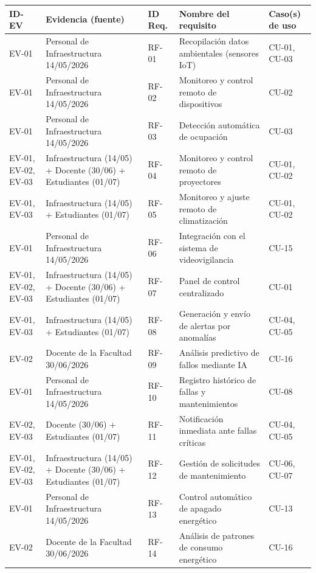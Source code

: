 \begingroup
\small
\begin{longtable}{|p{3.1cm}|p{3.1cm}|p{3.1cm}|p{3.1cm}|p{3.1cm}|}
\hline
ID-EV & Evidencia (fuente) & ID Req. & Nombre del requisito & Caso(s) de uso \\ \hline
EV-01 & Personal de Infraestructura 14/05/2026 & RF-01 & Recopilación datos ambientales (sensores IoT) & CU-01, CU-03 \\ \hline
EV-01 & Personal de Infraestructura 14/05/2026 & RF-02 & Monitoreo y control remoto de dispositivos & CU-02 \\ \hline
EV-01 & Personal de Infraestructura 14/05/2026 & RF-03 & Detección automática de ocupación & CU-03 \\ \hline
EV-01, EV-02, EV-03 & Infraestructura (14/05) + Docente (30/06) + Estudiantes (01/07) & RF-04 & Monitoreo y control remoto de proyectores & CU-01, CU-02 \\ \hline
EV-01, EV-03 & Infraestructura (14/05) + Estudiantes (01/07) & RF-05 & Monitoreo y ajuste remoto de climatización & CU-01, CU-02 \\ \hline
EV-01 & Personal de Infraestructura 14/05/2026 & RF-06 & Integración con el sistema de videovigilancia & CU-15 \\ \hline
EV-01, EV-02, EV-03 & Infraestructura (14/05) + Docente (30/06) + Estudiantes (01/07) & RF-07 & Panel de control centralizado & CU-01 \\ \hline
EV-01, EV-03 & Infraestructura (14/05) + Estudiantes (01/07) & RF-08 & Generación y envío de alertas por anomalías & CU-04, CU-05 \\ \hline
EV-02 & Docente de la Facultad 30/06/2026 & RF-09 & Análisis predictivo de fallos mediante IA & CU-16 \\ \hline
EV-01 & Personal de Infraestructura 14/05/2026 & RF-10 & Registro histórico de fallas y mantenimientos & CU-08 \\ \hline
EV-02, EV-03 & Docente (30/06) + Estudiantes (01/07) & RF-11 & Notificación inmediata ante fallas críticas & CU-04, CU-05 \\ \hline
EV-01, EV-02, EV-03 & Infraestructura (14/05) + Docente (30/06) + Estudiantes (01/07) & RF-12 & Gestión de solicitudes de mantenimiento & CU-06, CU-07 \\ \hline
EV-01 & Personal de Infraestructura 14/05/2026 & RF-13 & Control automático de apagado energético & CU-13 \\ \hline
EV-02 & Docente de la Facultad 30/06/2026 & RF-14 & Análisis de patrones de consumo energético & CU-16 \\ \hline

\end{longtable}
